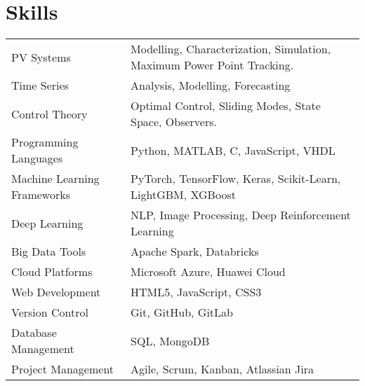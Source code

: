 \documentclass[a4paper,10pt]{article}
\begin{document}
\section{Skills}
\begin{longtable}{@{}l p{\linewidth}@{}}
PV Systems & Modelling, Characterization, Simulation, Maximum Power Point Tracking.\\
Time Series & Analysis, Modelling, Forecasting\\
Control Theory & Optimal Control, Sliding Modes, State Space, Observers.\\
Programming Languages & Python, MATLAB, C, JavaScript, VHDL\\
Machine Learning Frameworks & PyTorch, TensorFlow, Keras, Scikit-Learn, LightGBM, XGBoost\\
Deep Learning & NLP, Image Processing, Deep Reinforcement Learning\\
Big Data Tools & Apache Spark, Databricks\\
Cloud Platforms & Microsoft Azure, Huawei Cloud\\
Web Development & HTML5, JavaScript, CSS3\\
Version Control & Git, GitHub, GitLab\\
Database Management & SQL, MongoDB\\
Project Management & Agile, Scrum, Kanban, Atlassian Jira\\
\end{longtable}



\end{document}
